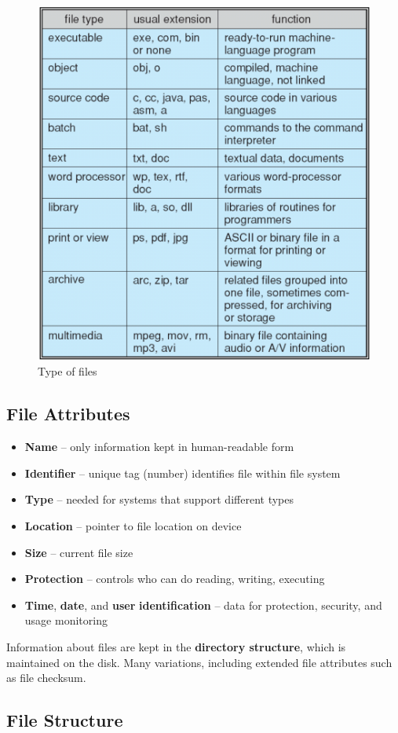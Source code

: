 \begin{figure}[h!]
    \centering
    \includegraphics[width=0.5\linewidth]{img/fgnfnfg.png}
    \caption{Type of files}
\end{figure}


\newpage
\subsection{File Attributes}

\begin{itemize}
    \item \textbf{Name} – only information kept in human-readable form
    \item \textbf{Identifier} – unique tag (number) identifies file within file system
    \item \textbf{Type} – needed for systems that support different types
    \item \textbf{Location} – pointer to file location on device
    \item \textbf{Size} – current file size
    \item \textbf{Protection} – controls who can do reading, writing, executing
    \item \textbf{Time}, \textbf{date}, and \textbf{user} \textbf{identification} – data for protection, security, and usage monitoring
\end{itemize}

Information about files are kept in the \textbf{directory structure}, which is
maintained on the disk. Many variations, including extended file attributes such as file checksum.

\subsection{File Structure}

